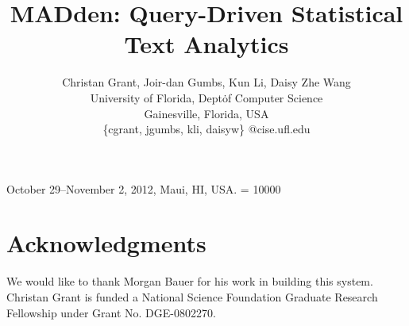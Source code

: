 \documentclass{sig-alt-release2}
\newcommand{\system}{MADden\xspace}
\begin{document}
 {October 29--November 2, 2012, Maui, HI, USA.} 
\widowpenalty = 10000


\title{\system: Query-Driven Statistical Text Analytics}


\author{Christan Grant, Joir-dan Gumbs, Kun Li, Daisy Zhe Wang \\
    University of Florida, Dept\. of Computer Science \\
    Gainesville, Florida, USA \\
    \{cgrant, jgumbs, kli, daisyw\} @cise.ufl.edu
}




\maketitle







%





%
\section{Acknowledgments}
We would like to thank Morgan Bauer for his work in building this system.
Christan Grant is funded a National Science Foundation Graduate Research 
Fellowship under Grant No. DGE-0802270.


\begin{small}

\end{small}
\end{document}
